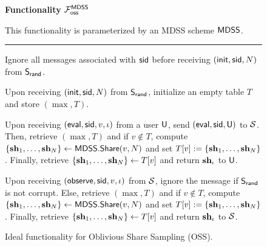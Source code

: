 \begin{figure}[h]
	\begin{center}
		\begin{techbox}
			\centerline{\textbf{Functionality} $\mathcal{F}_{\sf oss}^{\sf MDSS}$}

			This functionality is parameterized by an MDSS scheme ${\sf MDSS}$.
			\vspace{1mm}
			\hrule
			\vspace{2mm}
			Ignore all messages associated with ${\sf sid}$ before receiving $({\sf init}, {\sf sid}, N)$ from $\mathsf{S}_{\mathsf{rand}}$.
			\begin{algenumerate}
				\item Upon receiving $({\sf init}, {\sf sid}, N)$ from $\mathsf{S}_{\mathsf{rand}}$, initialize an empty table $T$ and store $(\max, T)$.
				\item Upon receiving $({\sf eval}, {\sf sid}, v, \iota)$ from a user $\mathsf{U}$, send $({\sf eval}, {\sf sid}, \mathsf{U})$ to $\mathcal{S}$. Then, retrieve $(\max, T)$ and if $v \notin T$, compute $\{\mathbf{sh}_1, \dots, \mathbf{sh}_{N}\} \leftarrow {\sf MDSS}.{{\sf Share}}(v, N)$ and set $T[v] := \{\mathbf{sh}_1, \dots, \mathbf{sh}_{N}\}$. Finally, retrieve $\{\mathbf{sh}_1, \dots, \mathbf{sh}_{N}\} \leftarrow T[v]$ and return $\mathbf{sh}_{\iota}$ to $\mathsf{U}$.
				\item Upon receiving $(\mathsf{observe}, {\sf sid}, v, \iota)$ from $\mathcal{S}$, ignore the message if $\mathsf{S}_{\mathsf{rand}}$ is not corrupt. Else, retrieve $(\max, T)$ and if $v \notin T$, compute $\{\mathbf{sh}_1, \dots, \mathbf{sh}_{N}\} \leftarrow {\sf MDSS}.{{\sf Share}}(v, N)$ and set $T[v] := \{\mathbf{sh}_1, \dots, \mathbf{sh}_{N}\}$. Finally, retrieve $\{\mathbf{sh}_1, \dots, \mathbf{sh}_{N}\} \leftarrow T[v]$ and return $\mathbf{sh}_{\iota}$ to $\mathcal{S}$.
			\end{algenumerate}
		\end{techbox}
	\end{center}
	\caption{Ideal functionality for Oblivious Share Sampling (OSS).}
	\label{fig:ideal_oss}
\end{figure}
